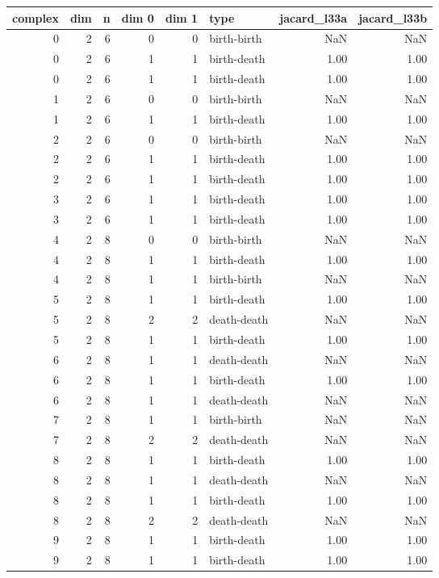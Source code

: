 \documentclass{article}
\begin{document}
\begin{center}
\begin{tabular}{rrrrrlrr}
\toprule
complex & dim & n & dim 0 & dim 1 & type & jacard\_l33a & jacard\_l33b \\
\midrule
0 & 2 & 6 & 0 & 0 & birth-birth & NaN & NaN \\
0 & 2 & 6 & 1 & 1 & birth-death & 1.00 & 1.00 \\
0 & 2 & 6 & 1 & 1 & birth-death & 1.00 & 1.00 \\
1 & 2 & 6 & 0 & 0 & birth-birth & NaN & NaN \\
1 & 2 & 6 & 1 & 1 & birth-death & 1.00 & 1.00 \\
2 & 2 & 6 & 0 & 0 & birth-birth & NaN & NaN \\
2 & 2 & 6 & 1 & 1 & birth-death & 1.00 & 1.00 \\
2 & 2 & 6 & 1 & 1 & birth-death & 1.00 & 1.00 \\
3 & 2 & 6 & 1 & 1 & birth-death & 1.00 & 1.00 \\
3 & 2 & 6 & 1 & 1 & birth-death & 1.00 & 1.00 \\
4 & 2 & 8 & 0 & 0 & birth-birth & NaN & NaN \\
4 & 2 & 8 & 1 & 1 & birth-death & 1.00 & 1.00 \\
4 & 2 & 8 & 1 & 1 & birth-birth & NaN & NaN \\
5 & 2 & 8 & 1 & 1 & birth-death & 1.00 & 1.00 \\
5 & 2 & 8 & 2 & 2 & death-death & NaN & NaN \\
5 & 2 & 8 & 1 & 1 & birth-death & 1.00 & 1.00 \\
6 & 2 & 8 & 1 & 1 & death-death & NaN & NaN \\
6 & 2 & 8 & 1 & 1 & birth-death & 1.00 & 1.00 \\
6 & 2 & 8 & 1 & 1 & death-death & NaN & NaN \\
7 & 2 & 8 & 1 & 1 & birth-birth & NaN & NaN \\
7 & 2 & 8 & 2 & 2 & death-death & NaN & NaN \\
8 & 2 & 8 & 1 & 1 & birth-death & 1.00 & 1.00 \\
8 & 2 & 8 & 1 & 1 & death-death & NaN & NaN \\
8 & 2 & 8 & 1 & 1 & birth-death & 1.00 & 1.00 \\
8 & 2 & 8 & 2 & 2 & death-death & NaN & NaN \\
9 & 2 & 8 & 1 & 1 & birth-death & 1.00 & 1.00 \\
9 & 2 & 8 & 1 & 1 & birth-death & 1.00 & 1.00 \\

\end{tabular}
\end{center}
\end{document}
